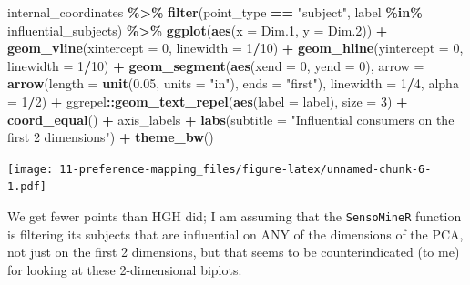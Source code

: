 \documentclass[
]{book}
\newenvironment{Shaded}{\begin{snugshade}}{\end{snugshade}}
\newcommand{\AttributeTok}[1]{\textcolor[rgb]{0.13,0.29,0.53}{#1}}
\newcommand{\DecValTok}[1]{\textcolor[rgb]{0.00,0.00,0.81}{#1}}
\newcommand{\FloatTok}[1]{\textcolor[rgb]{0.00,0.00,0.81}{#1}}
\newcommand{\FunctionTok}[1]{\textcolor[rgb]{0.13,0.29,0.53}{\textbf{#1}}}
\newcommand{\NormalTok}[1]{#1}
\newcommand{\SpecialCharTok}[1]{\textcolor[rgb]{0.81,0.36,0.00}{\textbf{#1}}}
\newcommand{\StringTok}[1]{\textcolor[rgb]{0.31,0.60,0.02}{#1}}
\begin{document}
\begin{Shaded}
\begin{Highlighting}[]
\NormalTok{internal\_coordinates }\SpecialCharTok{\%\textgreater{}\%}
  \FunctionTok{filter}\NormalTok{(point\_type }\SpecialCharTok{==} \StringTok{"subject"}\NormalTok{,}
\NormalTok{         label }\SpecialCharTok{\%in\%}\NormalTok{ influential\_subjects) }\SpecialCharTok{\%\textgreater{}\%}
  \FunctionTok{ggplot}\NormalTok{(}\FunctionTok{aes}\NormalTok{(}\AttributeTok{x =}\NormalTok{ Dim}\FloatTok{.1}\NormalTok{, }\AttributeTok{y =}\NormalTok{ Dim}\FloatTok{.2}\NormalTok{)) }\SpecialCharTok{+} 
  \FunctionTok{geom\_vline}\NormalTok{(}\AttributeTok{xintercept =} \DecValTok{0}\NormalTok{, }\AttributeTok{linewidth =} \DecValTok{1}\SpecialCharTok{/}\DecValTok{10}\NormalTok{) }\SpecialCharTok{+} 
  \FunctionTok{geom\_hline}\NormalTok{(}\AttributeTok{yintercept =} \DecValTok{0}\NormalTok{, }\AttributeTok{linewidth =} \DecValTok{1}\SpecialCharTok{/}\DecValTok{10}\NormalTok{) }\SpecialCharTok{+}
  \FunctionTok{geom\_segment}\NormalTok{(}\FunctionTok{aes}\NormalTok{(}\AttributeTok{xend =} \DecValTok{0}\NormalTok{, }\AttributeTok{yend =} \DecValTok{0}\NormalTok{),}
               \AttributeTok{arrow =} \FunctionTok{arrow}\NormalTok{(}\AttributeTok{length =} \FunctionTok{unit}\NormalTok{(}\FloatTok{0.05}\NormalTok{, }\AttributeTok{units =} \StringTok{"in"}\NormalTok{), }\AttributeTok{ends =} \StringTok{"first"}\NormalTok{),}
               \AttributeTok{linewidth =} \DecValTok{1}\SpecialCharTok{/}\DecValTok{4}\NormalTok{, }\AttributeTok{alpha =} \DecValTok{1}\SpecialCharTok{/}\DecValTok{2}\NormalTok{) }\SpecialCharTok{+} 
\NormalTok{  ggrepel}\SpecialCharTok{::}\FunctionTok{geom\_text\_repel}\NormalTok{(}\FunctionTok{aes}\NormalTok{(}\AttributeTok{label =}\NormalTok{ label), }\AttributeTok{size =} \DecValTok{3}\NormalTok{) }\SpecialCharTok{+} 
  \FunctionTok{coord\_equal}\NormalTok{() }\SpecialCharTok{+} 
\NormalTok{  axis\_labels }\SpecialCharTok{+} 
  \FunctionTok{labs}\NormalTok{(}\AttributeTok{subtitle =} \StringTok{"Influential consumers on the first 2 dimensions"}\NormalTok{) }\SpecialCharTok{+} 
  \FunctionTok{theme\_bw}\NormalTok{()}
\end{Highlighting}
\end{Shaded}

\texttt{[image: 11-preference-mapping\_files/figure-latex/unnamed-chunk-6-1.pdf]}

We get fewer points than HGH did; I am assuming that the \texttt{SensoMineR} function is filtering its subjects that are influential on ANY of the dimensions of the PCA, not just on the first 2 dimensions, but that seems to be counterindicated (to me) for looking at these 2-dimensional biplots.
\end{document}
